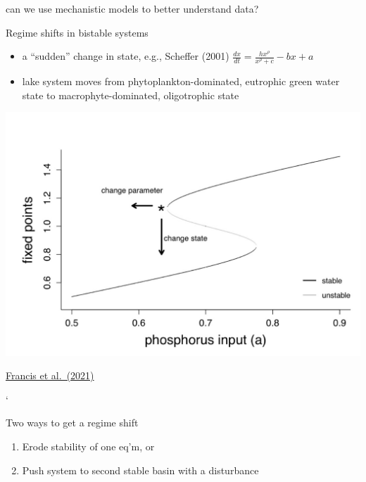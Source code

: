 \documentclass[
  ignorenonframetext,
]{beamer}
\providecommand{\tightlist}{%
  \setlength{\itemsep}{0pt}\setlength{\parskip}{0pt}}
\begin{document}
\begin{frame}{can we use mechanistic models to better understand data?}
\protect\hypertarget{can-we-use-mechanistic-models-to-better-understand-data}{}
\begin{block}{Regime shifts in bistable systems}
\protect\hypertarget{margins2}{}
\begin{itemize}
\tightlist
\item
  a ``sudden'' change in state, e.g., Scheffer (2001)
  \(\frac{dx}{dt}=\frac{hx^\rho}{x^\rho+c}-b x+a\)
\item
  lake system moves from phytoplankton-dominated, eutrophic green water
  state to macrophyte-dominated, oligotrophic state
\end{itemize}

\begin{center}\includegraphics[width=0.7\linewidth]{schefferbifur} \end{center}

\href{https://www.nature.com/articles/s41559-020-01365-0}{Francis et
al.~(2021)}

`
\end{block}

\begin{block}{Two ways to get a regime shift}
\protect\hypertarget{two-ways-to-get-a-regime-shift}{}
\begin{enumerate}
\tightlist
\item
  Erode stability of one eq'm, or
\item
  Push system to second stable basin with a disturbance
\end{enumerate}


\end{block}
\end{frame}
\end{document}
